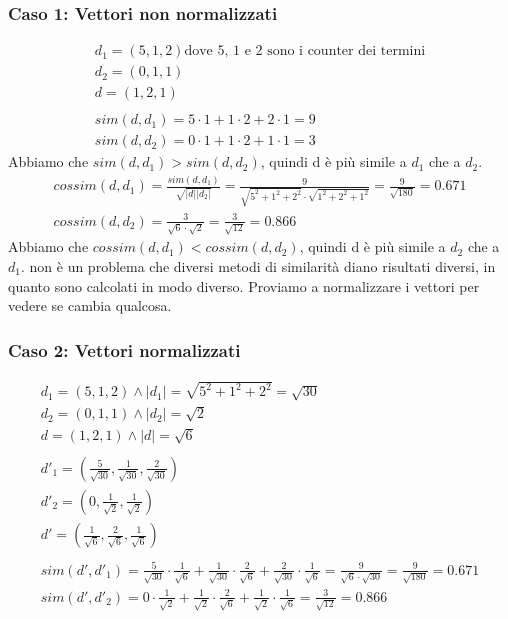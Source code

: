 \documentclass{report}
\begin{document}
	\subsubsection{Caso 1: Vettori non normalizzati}
	\[
		\begin{array}{l}
		d_1 = (5,1,2) \text{dove 5, 1 e 2 sono i counter dei termini}\\
		d_2 = (0,1,1)\\
		d = (1,2,1)\\\\
		sim(d,d_1) = 5 \cdot 1 + 1 \cdot 2 + 2 \cdot 1 = 9\\
		sim(d,d_2) = 0 \cdot 1 + 1 \cdot 2 + 1 \cdot 1 = 3
	\end{array}
	\]
	Abbiamo che $sim(d,d_1) > sim(d,d_2)$, quindi d è più simile a $d_1$ che a $d_2$.
	\[
	\begin{array}{l}
		cossim(d,d_1) = \frac{sim(d,d_1)}{\sqrt{|d||d_2|}} = \frac{9}{\sqrt{5^2 + 1^2 + 2^2} \cdot \sqrt{1^2 + 2^2 + 1^2}} = \frac{9}{\sqrt{180}} = 0.671\\
		cossim(d,d_2) = \frac{3}{\sqrt{6} \cdot \sqrt{2}} = \frac{3}{\sqrt{12}} = 0.866  
	\end{array}
	\]
	Abbiamo che $cossim(d,d_1) < cossim(d,d_2)$, quindi d è più simile a $d_2$ che a $d_1$.
	non è un problema che diversi metodi di similarità diano risultati diversi, in quanto sono calcolati in modo diverso. Proviamo a normalizzare i vettori per vedere se cambia qualcosa.

	\subsubsection{Caso 2: Vettori normalizzati}
	\[
	\begin{array}{l}
		d_1 = (5,1,2) \land |d_1| = \sqrt{5^2 + 1^2 + 2^2} = \sqrt{30}\\
		d_2 = (0,1,1) \land |d_2| = \sqrt{2}\\
		d = (1,2,1) \land |d| = \sqrt{6}\\\\
		d'_1 = \left( \frac{5}{\sqrt{30}}, \frac{1}{\sqrt{30}}, \frac{2}{\sqrt{30}} \right)\\
		d'_2 = \left( 0, \frac{1}{\sqrt{2}}, \frac{1}{\sqrt{2}} \right)\\
		d' = \left( \frac{1}{\sqrt{6}}, \frac{2}{\sqrt{6}}, \frac{1}{\sqrt{6}} \right)\\\\
		sim(d',d'_1) = \frac{5}{\sqrt{30}} \cdot \frac{1}{\sqrt{6}} + \frac{1}{\sqrt{30}} \cdot \frac{2}{\sqrt{6}} + \frac{2}{\sqrt{30}} \cdot \frac{1}{\sqrt{6}} = \frac{9}{\sqrt{6} \cdot \sqrt{30}} = \frac{9}{\sqrt{180}} = 0.671\\
		sim(d',d'_2) = 0 \cdot \frac{1}{\sqrt{2}} + \frac{1}{\sqrt{2}} \cdot \frac{2}{\sqrt{6}} + \frac{1}{\sqrt{2}} \cdot \frac{1}{\sqrt{6}} = \frac{3}{\sqrt{12}} = 0.866
	\end{array}
	\]
\end{document}
